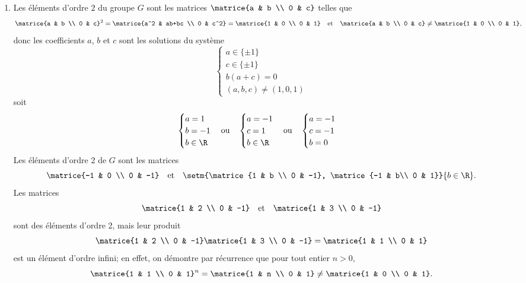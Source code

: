 \begin{enumerate}
    \item 
      Les éléments d'ordre $2$ du groupe $G$ sont les matrices
      $\matrice{a & b \\ 0 & c}$ telles que
      \[
        \matrice{a & b \\ 0 & c}^2 
        = \matrice{a^2 & ab+bc \\ 0 & c^2} 
        = \matrice{1 & 0 \\ 0 & 1}
        \quad\text{et}\quad
        \matrice{a & b \\ 0 & c}\neq\matrice{1 & 0 \\ 0 & 1},
      \]
    donc les coefficients $a$, $b$ et $c$ sont les solutions du système
    \[
        \begin{cases}
          a \in\{\pm 1\}\\
          c \in\{\pm 1\}\\
          b(a+c) = 0\\
          (a,b,c) \neq (1,0,1)
        \end{cases}
    \]
    soit
    \[
      \begin{cases}
        a = 1\\
        b = -1\\
        b \in \R
      \end{cases}
      \text{ou}\quad
      \begin{cases}
        a = -1\\
        c = 1\\
        b \in \R
      \end{cases}
      \text{ou}\quad
      \begin{cases}
        a = -1\\
        c = -1\\
        b = 0
      \end{cases}
    \]
    Les éléments d'ordre 2 de $G$ sont les matrices
    \[
      \matrice{-1 & 0 \\ 0 & -1}
      \quad\text{et}\quad
      \setm{\matrice{1 & b \\ 0 & -1}, \matrice{-1 & b\\ 0 & 1}}{b\in\R}.
    \]
    Les matrices 
    \[
      \matrice{1 & 2 \\ 0 & -1}
      \quad\text{et}\quad 
      \matrice{1 & 3 \\ 0 & -1}
    \]
    sont des éléments d'ordre 2, mais leur produit
    \[
      \matrice{1 & 2 \\ 0 & -1} \matrice{1 & 3 \\ 0 & -1} 
      = \matrice{1 & 1 \\ 0 & 1}
    \]
    est un élément d'ordre infini; en effet, on démontre par récurrence que
    pour tout entier $n>0$,
    \[
      \matrice{1 & 1 \\ 0 & 1}^n = 
        \matrice{1 & n \\ 0 & 1} \neq \matrice{1 & 0 \\ 0 & 1}.
    \]
\end{enumerate}


